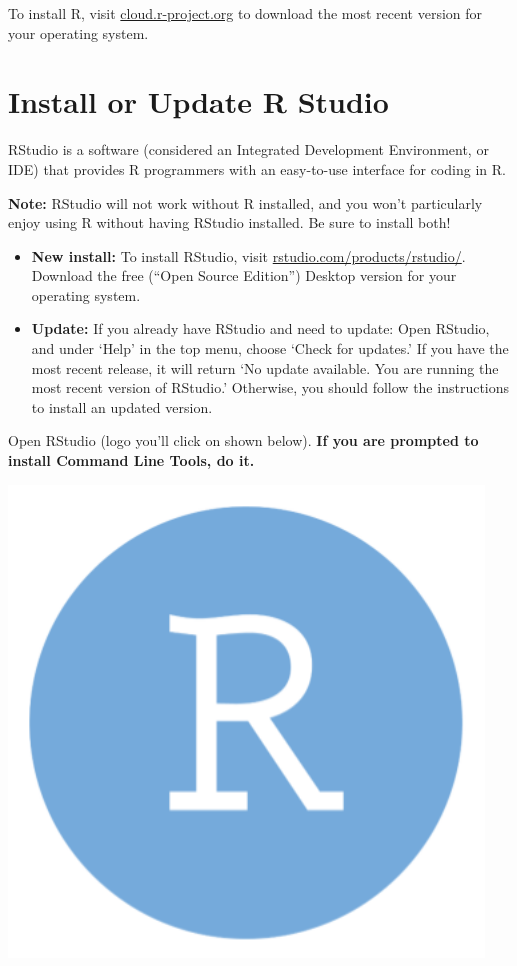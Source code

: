\documentclass[
]{book}
\begin{document}
To install R, visit \href{https://cloud.r-project.org/}{cloud.r-project.org} to download the most recent version for your operating system.

\hypertarget{install-or-update-r-studio}{%
\section{Install or Update R Studio}\label{install-or-update-r-studio}}

RStudio is a software (considered an Integrated Development Environment, or IDE) that provides R programmers with an easy-to-use interface for coding in R.

\textbf{Note:} RStudio will not work without R installed, and you won't particularly enjoy using R without having RStudio installed. Be sure to install both!

\begin{itemize}
\item
  \textbf{New install:} To install RStudio, visit \href{https://www.rstudio.com/products/rstudio/}{rstudio.com/products/rstudio/}. Download the free (``Open Source Edition'') Desktop version for your operating system.
\item
  \textbf{Update:} If you already have RStudio and need to update: Open RStudio, and under `Help' in the top menu, choose `Check for updates.' If you have the most recent release, it will return `No update available. You are running the most recent version of RStudio.' Otherwise, you should follow the instructions to install an updated version.
\end{itemize}

Open RStudio (logo you'll click on shown below). \textbf{If you are prompted to install Command Line Tools, do it.}

\begin{center}\includegraphics[width=4.97in]{images/rstudio} \end{center}
\end{document}
